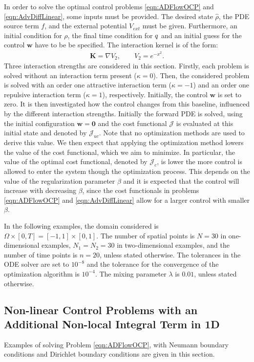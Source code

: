 
In order to solve the optimal control problems \eqref{eqn:ADFlowOCP} and \eqref{eqn:AdvDiffLinear}, some inputs must be provided. The desired state $\widehat \rho$, the PDE source term $f$, and the external potential $V_{ext}$ must be given. Furthermore, an initial condition for $\rho$, the final time condition for $q$ and an initial guess for the control $\mathbf{w}$ have to be be specified. 
The interaction kernel is of the form:
\begin{align*}
\mathbf{K} = \nabla V_2, \qquad V_2 = e^{-x^2}.
\end{align*}
Three interaction strengths are considered in this section. Firstly, each problem is solved without an interaction term present ($\kappa = 0$). Then, the considered problem is solved with an order one attractive interaction term ($\kappa = -1$) and an order one repulsive interaction term ($\kappa = 1$), respectively. Initially, the control $\mathbf{w}$ is set to zero. It is then investigated how the control changes from this baseline, influenced by the different interaction strengths. 
Initially the forward PDE is solved, using the initial configuration $\mathbf{w}=\mathbf 0$ and the cost functional $\mathcal J$ is evaluated at this initial state and denoted by $\mathcal{J}_{uc}$. Note that no optimization methods are used to derive this value. We then expect that applying the optimization method lowers the value of the cost functional, which we aim to minimize. 
In particular, the value of the optimal cost functional, denoted by $\mathcal{J}_c$, is lower the more control is allowed to enter the system though the optimization process. 
This depends on the value of the regularization parameter $\beta$ and it is expected that the control will increase with decreasing $\beta$, since the cost functionals in problems \eqref{eqn:ADFlowOCP} and \eqref{eqn:AdvDiffLinear} allow for a larger control with smaller $\beta$. 

In the following examples, the domain considered is $\Omega \times [0,T] = [-1,1] \times [0,1]$. The number of spatial points is $N=30$ in one-dimensional examples, $N_1 = N_2 = 30$ in two-dimensional examples, and the number of time points is $n=20$, unless stated otherwise. The tolerances in the ODE solver are set to $10^{-8}$ and the tolerance for the convergence of the optimization algorithm is $10^{-4}$. The mixing parameter $\lambda$ is $0.01$, unless stated otherwise.
\subsection{Non-linear Control Problems with an Additional Non-local Integral Term in 1D} \label{sec:Examples1d}
Examples of solving Problem \eqref{eqn:ADFlowOCP}, with Neumann boundary conditions and Dirichlet boundary conditions are given in this section. 
 
